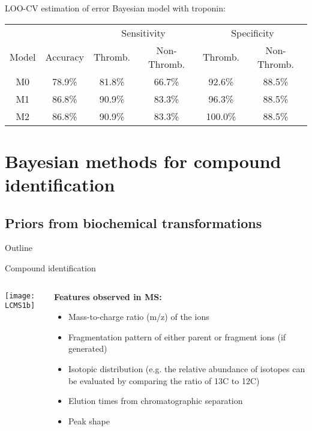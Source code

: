 \documentclass[xcolor=dvipsnames]{beamer}
\begin{document}
\begin{frame}{LOO-CV estimation of error}
	\vspace{-15pt}
	Bayesian model with troponin:
	\vspace{2ex}
	\begin{center}
		\begin{tabular}{|c|c|cc|cc|}
			\hline
			& & \multicolumn{2}{|c|}{Sensitivity} & \multicolumn{2}{|c|}{Specificity} \\
			Model & Accuracy & Thromb. & Non-Thromb. &  Thromb. & Non-Thromb.  \\
			\hline
			M0 & 78.9\% & 81.8\% & 66.7\% & 92.6\% & 88.5\% \\
			M1 & 86.8\% & 90.9\% & 83.3\% & 96.3\% & 88.5\% \\
			M2 & 86.8\% & 90.9\% & 83.3\% & 100.0\% & 88.5\% \\
			\hline
		\end{tabular}
	\end{center}
\end{frame}

\section{Bayesian methods for compound identification}
\subsection{Priors from biochemical transformations}
\begin{frame}{Outline}
	\vspace{-10.5pt}
	\tableofcontents[currentsection,subsectionstyle=hide]
\end{frame}

\begin{frame}{Compound identification}
	\begin{columns}
		\begin{column}{0.45\textwidth}
			\vspace{-35pt}
			\begin{center}
				\texttt{[image: LCMS1b]}
			\end{center}
		\end{column}
		\begin{column}{0.55\textwidth}
			\textbf{Features observed in MS:} \pause
			\begin{itemize}
				\item Mass-to-charge ratio (m/z) of the ions \pause
				\item Fragmentation pattern of either parent or fragment ions (if generated) \pause
				\item Isotopic distribution (e.g. the relative abundance of isotopes can be evaluated by comparing the ratio of 13C to 12C) \pause
				\item Elution times from chromatographic separation \pause
				\item Peak shape
			\end{itemize}
		\end{column}
	\end{columns}
\end{frame}
\end{document}

